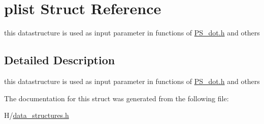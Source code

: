 \hypertarget{structplist}{
\section{plist Struct Reference}
\label{structplist}
}


this datastructure is used as input parameter in functions of \hyperlink{PS__dot_8h}{PS\_\-dot.h} and others  




\subsection{Detailed Description}
this datastructure is used as input parameter in functions of \hyperlink{PS__dot_8h}{PS\_\-dot.h} and others 

The documentation for this struct was generated from the following file:\begin{DoxyCompactItemize}
\item 
H/\hyperlink{data__structures_8h}{data\_\-structures.h}\end{DoxyCompactItemize}

